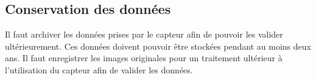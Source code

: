 

\subsection{Conservation des données}
\label{s:beo_bes_consdonn}
Il faut archiver les données prises par le capteur afin de pouvoir les valider ultérieurement.
Ces données doivent pouvoir être stockées pendant au moins deux ans.
Il faut enregistrer les images originales pour un traitement ultérieur à l’utilisation du capteur afin de valider les données.
